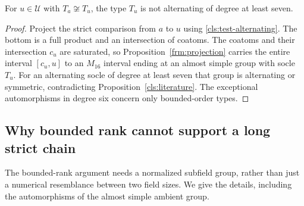 \begin{lemma}\label{cls:alternating}
For $u\in\mathcal U$ with $T_a\not\cong T_u$, the type $T_u$ is
not alternating of degree at least seven.
\end{lemma}
\begin{proof}
Project the strict comparison from $a$ to $u$ using
\ref{cls:test-alternating}.  The bottom is a full product and an
intersection of coatoms.  The coatoms and their intersection $c_u$
are saturated, so Proposition~\ref{frm:projection} carries the entire
interval $[c_u,u]$ to an $M_{16}$ interval ending at an almost simple
group with socle $T_u$.  For an alternating socle of degree at least
seven that group is alternating or symmetric, contradicting
Proposition~\ref{cls:literature}.  The exceptional automorphisms in
degree six concern only bounded-order types.
\end{proof}

\subsection{Why bounded rank cannot support a long strict chain}

The bounded-rank argument needs a normalized subfield group, rather
than just a numerical resemblance between two field sizes.  We give
the details, including the automorphisms of the almost simple ambient
group.

